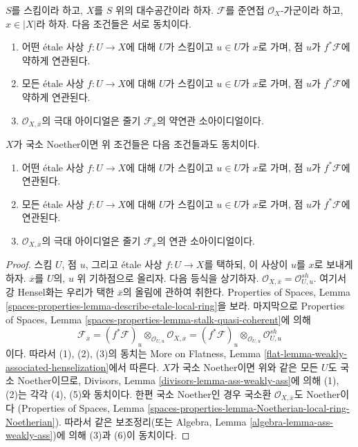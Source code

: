 \begin{lemma}
\label{lemma-associated}
$S$를 스킴이라 하고, $X$를 $S$ 위의 대수공간이라 하자.
$\mathcal{F}$를 준연접 $\mathcal{O}_X$-가군이라 하고, $x \in |X|$라 하자.
다음 조건들은 서로 동치이다.
\begin{enumerate}
\item 어떤 \'etale 사상 $f : U \to X$에 대해 $U$가 스킴이고
$u \in U$가 $x$로 가며, 점 $u$가 $f^*\mathcal{F}$에 약하게 연관된다.
\item 모든 \'etale 사상 $f : U \to X$에 대해 $U$가 스킴이고
$u \in U$가 $x$로 가며, 점 $u$가 $f^*\mathcal{F}$에 약하게 연관된다.
\item $\mathcal{O}_{X, \overline{x}}$의 극대 아이디얼은
줄기 $\mathcal{F}_{\overline{x}}$의 약연관 소아이디얼이다.
\end{enumerate}
$X$가 국소 Noether이면 위 조건들은 다음 조건들과도 동치이다.
\begin{enumerate}
\item[(4)] 어떤 \'etale 사상 $f : U \to X$에 대해 $U$가 스킴이고
$u \in U$가 $x$로 가며, 점 $u$가 $f^*\mathcal{F}$에 연관된다.
\item[(5)] 모든 \'etale 사상 $f : U \to X$에 대해 $U$가 스킴이고
$u \in U$가 $x$로 가며, 점 $u$가 $f^*\mathcal{F}$에 연관된다.
\item[(6)] $\mathcal{O}_{X, \overline{x}}$의 극대 아이디얼은
줄기 $\mathcal{F}_{\overline{x}}$의 연관 소아이디얼이다.
\end{enumerate}
\end{lemma}

\begin{proof}
스킴 $U$, 점 $u$, 그리고 \'etale 사상 $f : U \to X$를 택하되,
이 사상이 $u$를 $x$로 보내게 하자. $\overline{x}$를 $U$의,
$u$ 위 기하점으로 올리자. 다음 등식을 상기하자.
$\mathcal{O}_{X, \overline{x}} = \mathcal{O}_{U, u}^{sh}$.
여기서 강 Hensel화는 우리가 택한 $\overline{x}$의 올림에 관하여 취한다.
Properties of Spaces, Lemma
\ref{spaces-properties-lemma-describe-etale-local-ring}을 보라.
마지막으로 Properties of Spaces, Lemma
\ref{spaces-properties-lemma-stalk-quasi-coherent}에 의해
$$
\mathcal{F}_{\overline{x}} =
(f^*\mathcal{F})_u \otimes_{\mathcal{O}_{U, u}}
\mathcal{O}_{X, \overline{x}} =
(f^*\mathcal{F})_u \otimes_{\mathcal{O}_{U, u}}
\mathcal{O}_{U, u}^{sh}
$$
이다. 따라서 (1), (2), (3)의 동치는 More on Flatness, Lemma
\ref{flat-lemma-weakly-associated-henselization}에서 따른다.
$X$가 국소 Noether이면 위와 같은 모든 $U$도 국소 Noether이므로,
Divisors, Lemma \ref{divisors-lemma-ass-weakly-ass}에 의해
(1), (2)는 각각 (4), (5)와 동치이다. 한편 국소 Noether인 경우
국소환 $\mathcal{O}_{X, \overline{x}}$도 Noether이다
(Properties of Spaces, Lemma
\ref{spaces-properties-lemma-Noetherian-local-ring-Noetherian}).
따라서 같은 보조정리(또는 Algebra, Lemma
\ref{algebra-lemma-ass-weakly-ass})에 의해 (3)과 (6)이 동치이다.
\end{proof}

